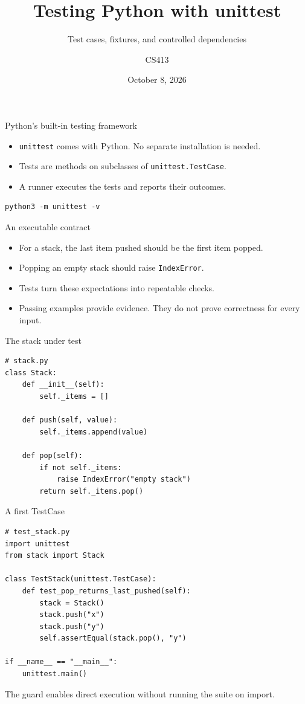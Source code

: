 \documentclass[aspectratio=169,11pt]{beamer}
\title{Testing Python with unittest}
\subtitle{Test cases, fixtures, and controlled dependencies}
\author{CS413}
\date{October 8, 2026}
\newcommand{\code}[1]{\texttt{#1}}
\begin{document}
\begin{frame}\titlepage\end{frame}
\begin{frame}[fragile]{Python's built-in testing framework}
\begin{itemize}
\item \code{unittest} comes with Python. No separate installation is needed.
\item Tests are methods on subclasses of \code{unittest.TestCase}.
\item A runner executes the tests and reports their outcomes.
\end{itemize}
\begin{lstlisting}
python3 -m unittest -v
\end{lstlisting}
\end{frame}

\begin{frame}[fragile]{An executable contract}
\begin{itemize}
\item For a stack, the last item pushed should be the first item popped.
\item Popping an empty stack should raise \code{IndexError}.
\item Tests turn these expectations into repeatable checks.
\item Passing examples provide evidence. They do not prove correctness for every input.
\end{itemize}
\end{frame}

\begin{frame}[fragile]{The stack under test}
\begin{lstlisting}
# stack.py
class Stack:
    def __init__(self):
        self._items = []

    def push(self, value):
        self._items.append(value)

    def pop(self):
        if not self._items:
            raise IndexError("empty stack")
        return self._items.pop()
\end{lstlisting}
\end{frame}

\begin{frame}[fragile]{A first TestCase}
\begin{lstlisting}
# test_stack.py
import unittest
from stack import Stack

class TestStack(unittest.TestCase):
    def test_pop_returns_last_pushed(self):
        stack = Stack()
        stack.push("x")
        stack.push("y")
        self.assertEqual(stack.pop(), "y")

if __name__ == "__main__":
    unittest.main()
\end{lstlisting}
The guard enables direct execution without running the suite on import.
\end{frame}
\end{document}

